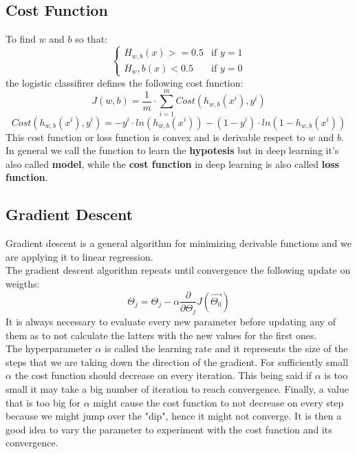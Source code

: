\documentclass{article}
\begin{document}
\subsection{Cost Function}
To find $w$ and $b$ so that:
$$\begin{cases}
    H_{w,b}(x) >= 0.5 & \text{if } y=1\\
    H_w,b(x)<0.5 & \text{if } y=0
\end{cases}$$
the logistic classifirer defines the following cost function:
\begin{equation}
    J(w,b) = \frac{1}{m}\cdot \sum_{i=1}^{m}{Cost(h_{w,b}(x^i),y^i)}
\end{equation}
\begin{equation}
    Cost(h_{w,b}(x^i),y^i)= -y^i\cdot ln(h_{w,b}(x^i))-(1-y^i)\cdot ln(1-h_{w,b}(x^i))
\end{equation}
This cost function or loss function is convex and is derivable respect to $w$ and $b$.
In general we call the function to learn the \textbf{hypotesis} but in deep learning it's also called \textbf{model}, while the \textbf{cost function} in deep learning is also called \textbf{loss function}.

\subsection{Gradient Descent}
Gradient descent is a general algorithm for minimizing derivable functions and we are applying it to linear regression.\\
The gradient descent algorithm repeats until convergence the following update on weigths:
\[ 
     \Theta_j = \Theta_j - \alpha \frac{\partial}{\partial\Theta_j}J(\vec{\Theta_0})
\]
It is always necessary to evaluate every new parameter before updating any of them as to not calculate the latters with the new values for the first ones.\\
The hyperparameter $\alpha$ is called the learning rate and it represents the size of the steps that we are taking down the direction of the gradient. For sufficiently small $\alpha$ the cost function should decrease on every iteration. This being said if $\alpha$ is too small it may take a big number of iteration to reach convergence. Finally, a value that is too big for $\alpha$ might cause the cost function to not decrease on every step because we might jump over the "dip", hence it might not converge. It is then a good idea to vary the parameter to experiment with the cost function and its convergence.
\end{document}
